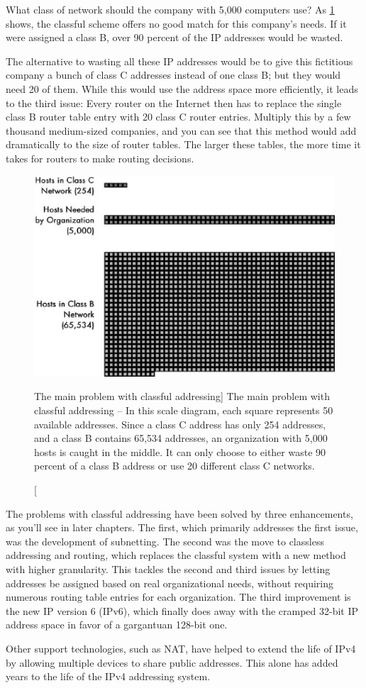 What class of network should the company with 5,000 computers use?
As \cref{fig:problem-with-classful} shows, the classful scheme offers no good match for this company's
needs. If it were assigned a class B, over 90 percent of the IP addresses would be wasted.

The alternative to wasting all these IP addresses would be to give this
fictitious company a bunch of class C addresses instead of one class B;
but they would need 20 of them. While this would use the address space
more efficiently, it leads to the third issue: Every router on the
Internet then has to replace the single class B router table entry with
20 class C router entries. Multiply this by a few thousand medium-sized
companies, and you can see that this method would add dramatically to
the size of router tables. The larger these tables, the more time it
takes for routers to make routing decisions.


\begin{figure}
   \centering
   \includegraphics[width=.7\textwidth]{images/problem-with-classful.jpg}
   \caption
      [The main problem with classful addressing]
      {The main problem with classful addressing -- In this scale
      diagram, each square represents 50 available addresses. Since a class C
      address has only 254 addresses, and a class B contains 65,534 addresses,
      an organization with 5,000 hosts is caught in the middle. It can only
      choose to either waste 90 percent of a class B address or use 20 different class C networks.}
   \label{fig:problem-with-classful}
\end{figure}


The problems with classful addressing have been solved by three
enhancements, as you'll see in later chapters. The first, which
primarily addresses the first issue, was the development of subnetting.
The second was the move to classless addressing and routing, which
replaces the classful system with a new method with higher granularity.
This tackles the second and third issues by letting addresses be
assigned based on real organizational needs, without requiring numerous
routing table entries for each organization. The third improvement is
the new IP version 6 (IPv6), which finally does away with the cramped
32-bit IP address space in favor of a gargantuan 128-bit one.

Other support technologies, such as NAT, have helped to extend the life
of IPv4 by allowing multiple devices to share public addresses. This
alone has added years to the life of the IPv4 addressing system.
